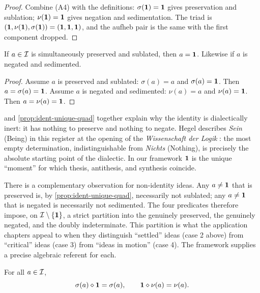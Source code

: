 \begin{proof}
Combine (A4) with the definitions: $\sigma(\mathbf{1})=\mathbf{1}$ gives
preservation and sublation; $\nu(\mathbf{1})=\mathbf{1}$ gives negation and
sedimentation. The triad is $(\mathbf{1},\nu(\mathbf{1}),\sigma(\mathbf{1}))=
(\mathbf{1},\mathbf{1},\mathbf{1})$, and the aufheb pair is the same with the first
component dropped.
\end{proof}

\begin{proposition}\label{prop:ident-unique-quad}
If $a\in\mathcal{I}$ is simultaneously preserved and sublated, then
$a=\mathbf{1}$. Likewise if $a$ is negated and sedimented.
\end{proposition}

\begin{proof}
Assume $a$ is preserved and sublated: $\sigma(a)=a$ and
$\sigma(a)=\mathbf{1}$. Then $a=\sigma(a)=\mathbf{1}$. Assume $a$ is negated
and sedimented: $\nu(a)=a$ and $\nu(a)=\mathbf{1}$. Then $a=\nu(a)=\mathbf{1}$.
\end{proof}

\begin{remark}
 and \cref{prop:ident-unique-quad} together
explain why the identity is dialectically inert: it has nothing to
preserve and nothing to negate. Hegel describes \emph{Sein} (Being)
in this register at the opening of the \emph{Wissenschaft der Logik}
\citep{Hegel1812}: the most empty determination, indistinguishable
from \emph{Nichts} (Nothing), is precisely the absolute starting
point of the dialectic. In our framework $\mathbf{1}$ is the unique
``moment'' for which thesis, antithesis, and synthesis coincide.
\end{remark}

There is a complementary observation for non-identity ideas. Any
$a\neq\mathbf{1}$ that is preserved is, by \cref{prop:ident-unique-quad},
necessarily not sublated; any $a\neq\mathbf{1}$ that is negated is
necessarily not sedimented. The four predicates therefore impose, on
$\mathcal{I}\setminus\{\mathbf{1}\}$, a strict partition into the genuinely
preserved, the genuinely negated, and the doubly indeterminate. This
partition is what the application chapters
\citep{Lovejoy1936,Bourdieu1984} appeal to when they distinguish
``settled'' ideas (case 2 above) from ``critical'' ideas (case 3)
from ``ideas in motion'' (case 4). The framework supplies a precise
algebraic referent for each.

\begin{corollary}\label{cor:ident-proj}
For all $a\in\mathcal{I}$,
\[
\sigma(a)\mathbin{\diamond}\mathbf{1}=\sigma(a),\qquad
\mathbf{1}\mathbin{\diamond}\nu(a)=\nu(a).
\]
\end{corollary}

